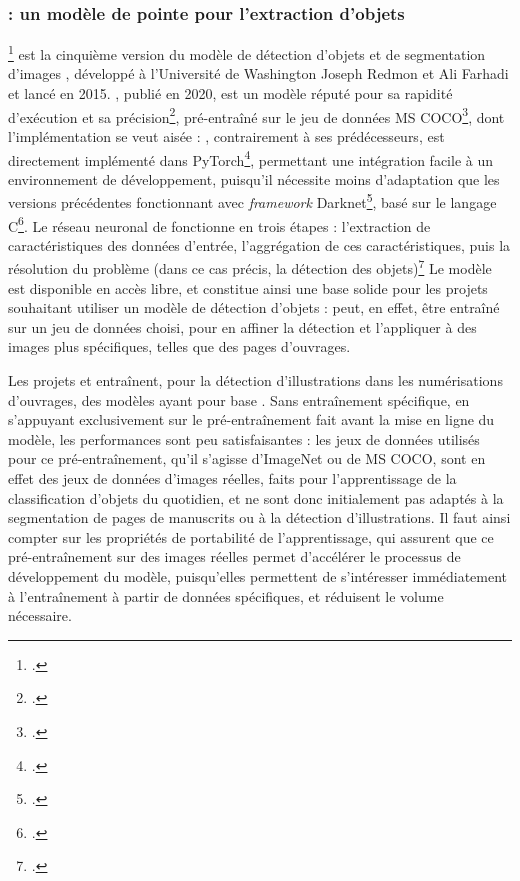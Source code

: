     \subsubsection{\yolov : un modèle de pointe pour l'extraction d'objets}
	\yolov\footcite{ultralyticsUltralyticsYOLOv8Docs} est la cinquième version du modèle de détection d'objets et de segmentation d'images \yolo, développé à l'Université de Washington Joseph Redmon et Ali Farhadi et lancé en 2015. \yolov, publié en 2020, est un modèle réputé pour sa rapidité d'exécution et sa précision\footcite{buttnerCorDeepSacroboscoDataset2022}, pré-entraîné sur le jeu de données MS COCO\footcite{COCOCommonObjects}, dont l'implémentation se veut aisée : \yolov, contrairement à ses prédécesseurs, est directement implémenté dans PyTorch\footcite{PyTorch}, permettant une intégration facile à un environnement de développement, puisqu'il nécessite moins d'adaptation que les versions précédentes fonctionnant avec \textit{framework} Darknet\footcite{DarknetOpenSource}, basé sur le langage C\footcite{sharmaTrainingYOLOv5Object2022}. Le réseau neuronal de \yolo fonctionne en trois étapes : l'extraction de caractéristiques des données d'entrée, l'aggrégation de ces caractéristiques, puis la résolution du problème (dans ce cas précis, la détection des objets)\footcite{buttnerCorDeepSacroboscoDataset2022} Le modèle est disponible en accès libre, et constitue ainsi une base solide pour les projets souhaitant utiliser un modèle de détection d'objets : \yolov peut, en effet, être entraîné sur un jeu de données choisi, pour en affiner la détection et l'appliquer à des images plus spécifiques, telles que des pages d'ouvrages.
	
	Les projets \eida et \vhs entraînent, pour la détection d'illustrations dans les numérisations d'ouvrages, des modèles ayant pour base \yolov. Sans entraînement spécifique, en s'appuyant exclusivement sur le pré-entraînement fait avant la mise en ligne du modèle, les performances sont peu satisfaisantes : les jeux de données utilisés pour ce pré-entraînement, qu'il s'agisse d'ImageNet ou de MS COCO, sont en effet des jeux de données d'images réelles, faits pour l'apprentissage de la classification d'objets du quotidien, et ne sont donc initialement pas adaptés à la segmentation de pages de manuscrits ou à la détection d'illustrations. Il faut ainsi compter sur les propriétés de portabilité de l'apprentissage, qui assurent que ce pré-entraînement sur des images réelles permet d'accélérer le processus de développement du modèle, puisqu'elles permettent de s'intéresser immédiatement à l'entraînement à partir de données spécifiques, et réduisent le volume nécessaire. 
	
